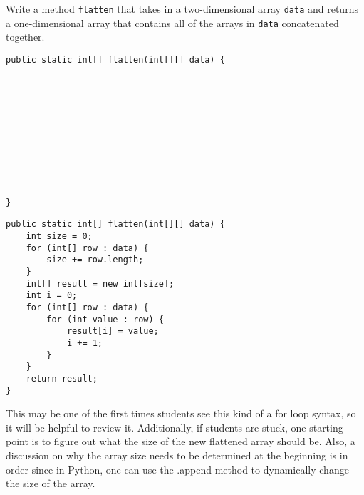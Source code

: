 \begin{blocksection}
\question Write a method \lstinline$flatten$ that takes in a two-dimensional array
\lstinline$data$ and returns a one-dimensional array that contains all of the
arrays in \lstinline$data$ concatenated together.

\ifprintanswers\else
\begin{lstlisting}
public static int[] flatten(int[][] data) {











}
\end{lstlisting}
\fi

\begin{solution}
\begin{lstlisting}
public static int[] flatten(int[][] data) {
    int size = 0;
    for (int[] row : data) {
        size += row.length;
    }
    int[] result = new int[size];
    int i = 0;
    for (int[] row : data) {
        for (int value : row) {
            result[i] = value;
            i += 1;
        }
    }
    return result;
}
\end{lstlisting}

\begin{meta}
This may be one of the first times students see this kind of a for loop syntax, so it will be helpful to review it. Additionally, if students are stuck, one starting point is to figure out what the size of the new flattened array should be. Also, a discussion on why the array size needs to be determined at the beginning is in order since in Python, one can use the .append method to dynamically change the size of the array.
\end{meta}

\end{solution}
\end{blocksection}

